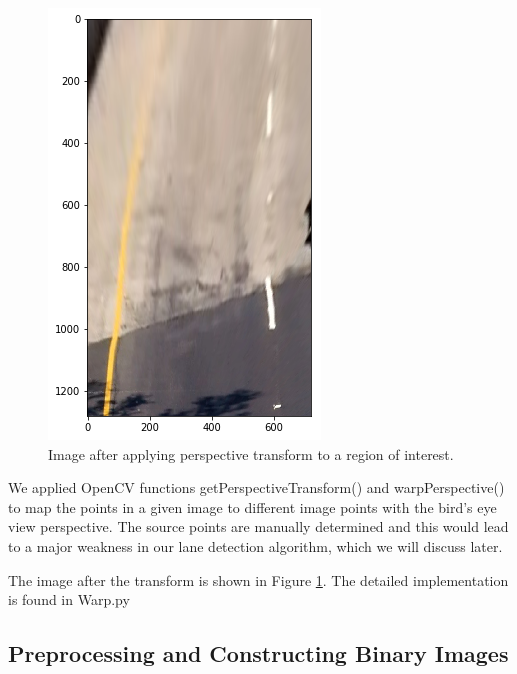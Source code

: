 \documentclass[12pt,twoside]{article}
\begin{document}
\begin{figure}[H]
	\begin{center}
		\includegraphics[width = 0.4\hsize]{./figures/Warped.png} 
		\caption{Image after applying perspective transform to a region of interest.} %
		\label{fig:posttransform} %
	\end{center}
\end{figure}

We applied OpenCV functions getPerspectiveTransform() and warpPerspective() to map the points in a given image to different image points with the bird's eye view perspective. The source points are manually determined and this would lead to a major weakness in our lane detection algorithm, which we will discuss later. 

The image after the transform is shown in Figure \ref{fig:posttransform}. The detailed implementation is found in Warp.py





\subsection{Preprocessing and Constructing Binary Images}
\end{document}
